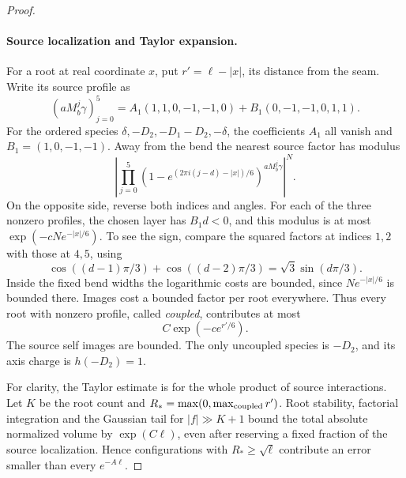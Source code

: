 \documentclass[11pt]{article}
\numberwithin{equation}{section}
\theoremstyle{definition}\newtheorem{definition}[theorem]{Definition}
\theoremstyle{remark}\newtheorem{remark}[theorem]{Remark}
\begin{document}
\begin{proof}
\paragraph{Source localization and Taylor expansion.}
For a root at real coordinate \(x\), put \(r'=\ell-|x|\), its distance
from the seam. Write its source profile as
\[
 (aM_b^j\gamma)_{j=0}^5
 =A_1(1,1,0,-1,-1,0)+B_1(0,-1,-1,0,1,1).
\]
For the ordered species
\(\delta,-D_2,-D_1-D_2,-\delta\), the coefficients \(A_1\) all
vanish and \(B_1=(1,0,-1,-1)\). Away from the bend the nearest source
factor has modulus
\[
 \left|\prod_{j=0}^5
 (1-e^{(2\pi i(j-d)-|x|)/6})^{aM_b^j\gamma}\right|^N.
\]
On the opposite side, reverse both indices and angles. For each of the
three nonzero profiles, the chosen layer has \(B_1d<0\), and this
modulus is at most \(\exp(-cNe^{-|x|/6})\). To see the sign, compare
the squared factors at indices \(1,2\) with those at \(4,5\), using
\[
 \cos((d-1)\pi/3)+\cos((d-2)\pi/3)
       =\sqrt3\sin(d\pi/3).
\]
Inside the fixed bend widths the logarithmic costs are bounded, since
\(Ne^{-|x|/6}\) is bounded there. Images cost a bounded factor per
root everywhere. Thus every root with nonzero profile, called
\emph{coupled}, contributes at most
\[
 C\exp(-c e^{r'/6}).
\]
The source self images are bounded. The only uncoupled species is
\(-D_2\), and its axis charge is \(h(-D_2)=1\).

For clarity, the Taylor estimate is for the whole product of source
interactions. Let \(K\) be the root count and
\(R_* =\max(0,\max_{\rm coupled}r')\). Root stability, factorial
integration and the Gaussian tail for \(|f|\gg K+1\) bound the total
absolute normalized volume by \(\exp(C\ell)\), even after reserving a
fixed fraction of the source localization. Hence configurations with
\(R_*\ge\sqrt\ell\) contribute an error smaller than every
\(e^{-A\ell}\).


\end{proof}
\end{document}
